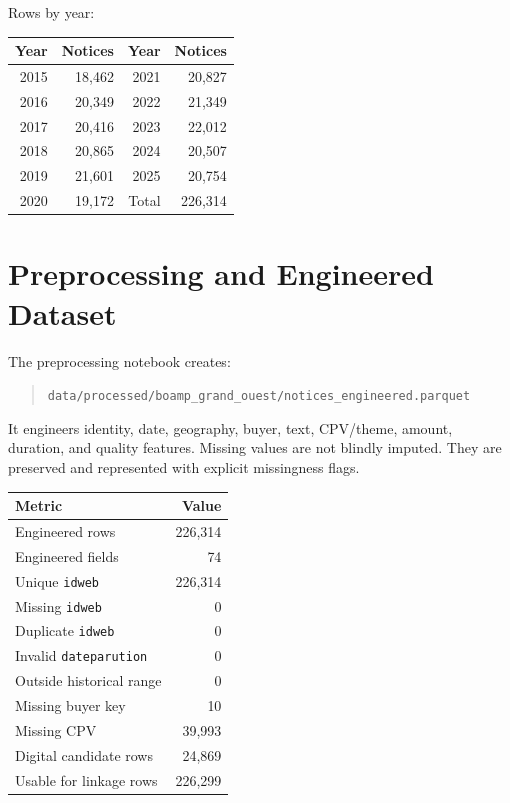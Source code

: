 \documentclass[11pt,a4paper]{article}
\newcommand{\code}[1]{\texttt{#1}}
\newcommand{\pathcode}[1]{{\small\nolinkurl{#1}}}
\begin{document}
Rows by year:

\begin{center}
\begin{tabular}{rrrr}
\toprule
Year & Notices & Year & Notices \\
\midrule
2015 & 18,462 & 2021 & 20,827 \\
2016 & 20,349 & 2022 & 21,349 \\
2017 & 20,416 & 2023 & 22,012 \\
2018 & 20,865 & 2024 & 20,507 \\
2019 & 21,601 & 2025 & 20,754 \\
2020 & 19,172 & Total & 226,314 \\
\bottomrule
\end{tabular}
\end{center}

\section*{Preprocessing and Engineered Dataset}

The preprocessing notebook creates:

\begin{quote}
\pathcode{data/processed/boamp_grand_ouest/notices_engineered.parquet}
\end{quote}

It engineers identity, date, geography, buyer, text, CPV/theme, amount, duration, and quality features. Missing values are not blindly imputed. They are preserved and represented with explicit missingness flags.

\begin{center}
\begin{tabular}{lr}
\toprule
Metric & Value \\
\midrule
Engineered rows & 226,314 \\
Engineered fields & 74 \\
Unique \code{idweb} & 226,314 \\
Missing \code{idweb} & 0 \\
Duplicate \code{idweb} & 0 \\
Invalid \code{dateparution} & 0 \\
Outside historical range & 0 \\
Missing buyer key & 10 \\
Missing CPV & 39,993 \\
Digital candidate rows & 24,869 \\
Usable for linkage rows & 226,299 \\
\bottomrule
\end{tabular}
\end{center}
\end{document}
